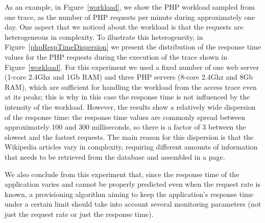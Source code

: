 As an example, in Figure~\ref{workload}, we show the PHP workload
sampled from one trace, as the number of PHP requests per minute
during approximately one day. One aspect that we noticed about the
workload is that the requests are heterogeneous in complexity.  To
illustrate this heterogeneity, in Figure~\ref{phpRespTimeDispersion}
we present the distribution of the response time values for the PHP
requests during the execution of the trace shown in
Figure~\ref{workload}.  For this experiment we used a fixed number of
one web server (1-core 2.4Ghz and 1Gb RAM) and three PHP servers (8-core 2.4Ghz and 8Gb RAM), which are sufficient for handling the workload from the
access trace even at its peaks; this is why in this case the response
time is not influenced by the intensity of the workload.  However, the
results show a relatively wide dispersion of the response time: the
response time values are commonly spread between approximately 100 and
300 milliseconds, so there is a factor of 3 between the slowest and
the fastest requests.  The main reason for this dispersion is that the
Wikipedia articles vary in complexity, requiring different amounts of
information that needs to be retrieved from the database and assembled
in a page.


We also conclude from this experiment that, since the response time of
the application varies and cannot be properly predicted even when the
request rate is known, a provisioning algorithm aiming to keep the
application's response time under a certain limit should take into
account several monitoring parameters (not just the request rate or
just the response time).







